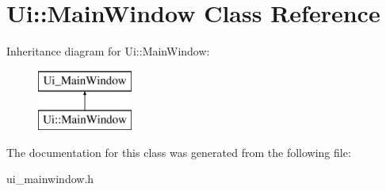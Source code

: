 \hypertarget{class_ui_1_1_main_window}{\section{Ui\-:\-:Main\-Window Class Reference}
\label{class_ui_1_1_main_window}
}
Inheritance diagram for Ui\-:\-:Main\-Window\-:\begin{figure}[H]
\begin{center}
\leavevmode
\includegraphics[height=2.000000cm]{class_ui_1_1_main_window}
\end{center}
\end{figure}


The documentation for this class was generated from the following file\-:\begin{DoxyCompactItemize}
\item 
ui\-\_\-mainwindow.\-h\end{DoxyCompactItemize}
